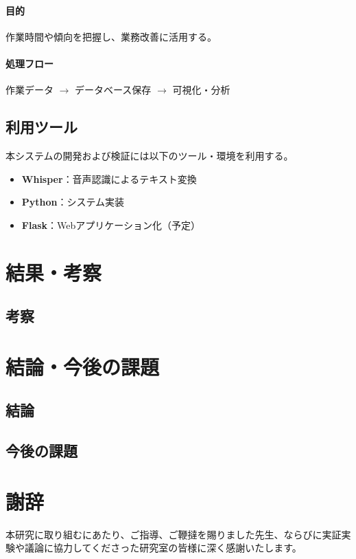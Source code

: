 \documentclass[a4paper,12pt,ja=standard,lualatex]{bxjsarticle}
\begin{document}
\paragraph{目的}
作業時間や傾向を把握し、業務改善に活用する。
\paragraph{処理フロー}
作業データ $\rightarrow$ データベース保存 $\rightarrow$ 可視化・分析

\subsection{利用ツール}
本システムの開発および検証には以下のツール・環境を利用する。
\begin{itemize}
    \item \textbf{Whisper}：音声認識によるテキスト変換
    \item \textbf{Python}：システム実装
    \item \textbf{Flask}：Webアプリケーション化（予定）
\end{itemize}

\newpage

\section{結果・考察}\label{sec4}


\subsection{考察}

\newpage

\section{結論・今後の課題}\label{sec5}

\subsection{結論}

\subsection{今後の課題}

\newpage

\section*{謝辞}
本研究に取り組むにあたり、ご指導、ご鞭撻を賜りました先生、ならびに実証実験や議論に協力してくださった研究室の皆様に深く感謝いたします。

\newpage




\newpage
\appendix
\end{document}
